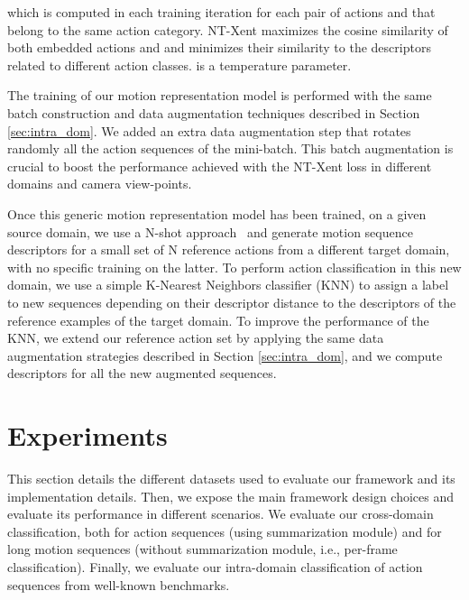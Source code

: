\documentclass[letterpaper, 10 pt, conference]{ieeeconf}
\begin{document}
\noindent which is computed in each training iteration for each pair of actions  and  that belong to the same action category. NT-Xent maximizes the cosine similarity of both embedded actions  and  and minimizes their similarity to the descriptors related to different action classes.  is a temperature parameter.



The training of our motion representation model is performed with the same batch construction and data augmentation techniques described in Section \ref{sec:intra_dom}. We added an extra data augmentation step that rotates randomly all the action sequences of the mini-batch. This batch augmentation is crucial to boost the performance achieved with the NT-Xent loss in different domains and camera view-points. 



Once this generic motion representation model has been trained, on a given source domain, we use a N-shot approach~\cite{wang2019simpleshot} and generate motion sequence descriptors for a small set of N reference actions from a different target domain, with no specific training on the latter. To perform action classification in this new domain, 
we use a simple K-Nearest Neighbors classifier (KNN) to assign a label to new sequences depending on their descriptor distance to the descriptors of the reference examples of the target domain. To improve the performance of the KNN, 
we extend our reference action set by applying the same data augmentation strategies described in Section \ref{sec:intra_dom}, and we compute descriptors for all the new augmented sequences. 












\section{Experiments}
This section details the different datasets used to evaluate our framework and its implementation details.
Then, we expose the main framework design choices and evaluate its performance in different scenarios.
We evaluate our cross-domain classification, both for action sequences (using summarization module) and for long motion sequences (without summarization module, i.e., per-frame classification).
Finally, we evaluate our intra-domain classification of action sequences from well-known benchmarks.
\end{document}
